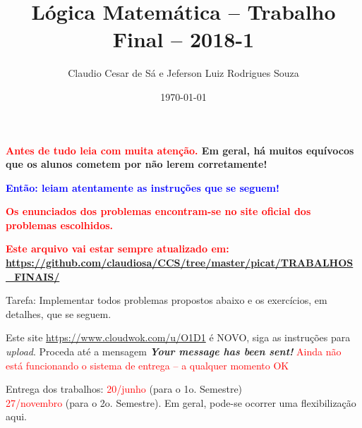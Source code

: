 \documentclass[a4paper,12pt]{article}
\title{Lógica Matemática -- Trabalho Final -- 2018-1}
\author{Claudio Cesar de Sá e Jeferson Luiz Rodrigues Souza}
\date{\today}
\begin{document}
\maketitle

\begin{flushleft}


\vspace{0.5cm}
  {\bf \textcolor{red}{
Antes de tudo leia com \textbf{muita atenção}.} Em geral, há muitos equívocos
que os alunos cometem por não lerem corretamente!}


\vspace{0.5cm}
 {\bf \textcolor{blue}{Então: leiam atentamente as
instruções que se seguem!}}


\vspace{0.5cm}
  {\bf \textcolor{red}{Os enunciados dos problemas encontram-se no site oficial dos problemas escolhidos.}}


\vspace{0.5cm}
  {\bf \textcolor{red}{Este arquivo vai estar sempre atualizado em: }}\\
{\bf \textcolor{red}{\url{https://github.com/claudiosa/CCS/tree/master/picat/TRABALHOS_FINAIS/}}}

\vspace{0.5cm}
 Tarefa: Implementar todos  
 problemas propostos abaixo e os exercícios, em detalhes, que se seguem. 



\vspace{0.5cm}
  Este site  \textcolor{red}{\url{https://www.cloudwok.com/u/O1D1}} é NOVO, siga as instruções para \emph{upload}. Proceda até
a mensagem \textbf{ \emph{Your message has been sent!}}
\vspace{0.25cm}
 \textcolor{red}{Ainda não está funcionando o sistema de entrega -- a qualquer momento OK}


\vspace{0.5cm}
 Entrega dos trabalhos: \textcolor{red}{20/junho} (para o 1o. Semestre)\\
\textcolor{red}{27/novembro} (para o 2o. Semestre). Em geral, pode-se
ocorrer uma flexibilização aqui.\\


\end{flushleft}
\end{document}

